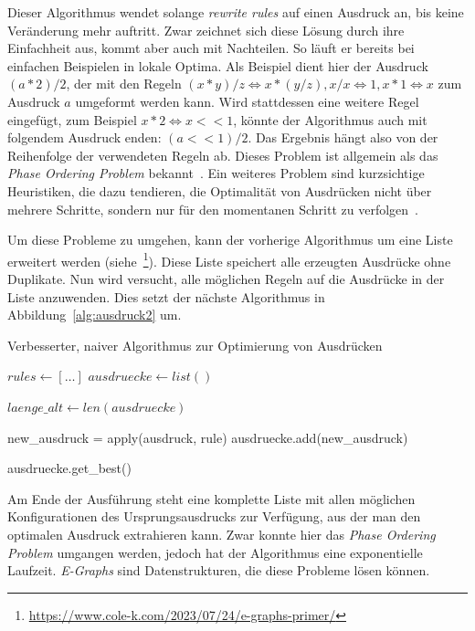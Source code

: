 Dieser Algorithmus wendet solange \textit{rewrite rules} auf einen Ausdruck an, bis keine Veränderung mehr auftritt.
Zwar zeichnet sich diese Lösung durch ihre Einfachheit aus, kommt aber auch mit Nachteilen.
So läuft er bereits bei einfachen Beispielen in lokale Optima. 
Als Beispiel dient hier der Ausdruck $(a * 2) / 2$, der mit den Regeln $(x * y) / z \Leftrightarrow x * (y / z), x / x \Leftrightarrow 1, x * 1 \Leftrightarrow x$ 
zum Ausdruck $a$ umgeformt werden kann.
Wird stattdessen eine weitere Regel eingefügt, zum Beispiel $x * 2 \Leftrightarrow x << 1$, könnte der Algorithmus auch mit folgendem Ausdruck enden: $(a << 1) / 2$.
Das Ergebnis hängt also von der Reihenfolge der verwendeten Regeln ab. Dieses Problem ist allgemein als das \textit{Phase Ordering Problem} bekannt~\cite{phaseorder-2009}.
Ein weiteres Problem sind kurzsichtige Heuristiken, die dazu tendieren, die Optimalität von Ausdrücken nicht über mehrere Schritte, sondern nur für den momentanen Schritt
zu verfolgen~\cite{phaseorder-2009}.

\noindent Um diese Probleme zu umgehen, kann der vorherige Algorithmus um eine Liste erweitert werden (siehe~\footnote{\url{https://www.cole-k.com/2023/07/24/e-graphs-primer/}}).
Diese Liste speichert alle erzeugten Ausdrücke ohne Duplikate. Nun wird versucht, alle möglichen Regeln auf die Ausdrücke in der Liste anzuwenden. 
Dies setzt der nächste Algorithmus in Abbildung~\ref{alg:ausdruck2} um.

\begin{algorithm}[H]
  \caption{Verbesserter, naiver Algorithmus zur Optimierung von Ausdrücken}\label{alg:ausdruck2}
  \begin{algorithmic}
    \State $rules \gets [\ldots]$
    \State $ausdruecke \gets list()$
    
      \State $laenge\_alt \gets len(ausdruecke)$

          \State new\_ausdruck = apply(ausdruck, rule)
          \State ausdruecke.add(new\_ausdruck)
          \EndIf
        \EndFor
      \EndFor
    \EndWhile

    \State \Return ausdruecke.get\_best()
    \EndFunction
  \end{algorithmic}
\end{algorithm}

Am Ende der Ausführung steht eine komplette Liste mit allen möglichen Konfigurationen des Ursprungsausdrucks zur Verfügung, aus der man den optimalen Ausdruck extrahieren kann.
Zwar konnte hier das \textit{Phase Ordering Problem} umgangen werden, jedoch hat der Algorithmus eine exponentielle Laufzeit.
\textit{E-Graphs} sind Datenstrukturen, die diese Probleme lösen können.

